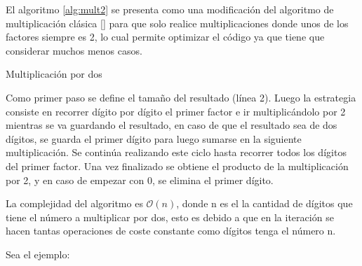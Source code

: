 \documentclass[10pt,journal,compsoc]{IEEEtran}
\begin{document}
El algoritmo \ref{alg:mult2} se presenta como una modificación del algoritmo de multiplicación clásica [\cite{DK14}] para que solo realice multiplicaciones donde unos de los factores siempre es 2, lo cual permite optimizar el código ya que tiene que considerar muchos menos casos.

\begin{algorithm}
\DontPrintSemicolon
{}

\caption{ Multiplicación por dos}
\label{alg:mult2}
\end{algorithm}


Como primer paso se define el tamaño del resultado (línea 2).
Luego la estrategia consiste en recorrer dígito por dígito el primer factor e ir multiplicándolo por 2 mientras se va guardando el resultado, en caso de que el resultado sea de dos dígitos, se guarda el primer dígito para luego sumarse en la siguiente multiplicación. Se continúa realizando este ciclo hasta recorrer todos los dígitos del primer factor.
Una vez finalizado se obtiene el producto de la multiplicación por 2, y en caso de empezar con 0, se elimina el primer dígito.

La complejidad del algoritmo es $\mathcal{O}(n)$, donde n es el la cantidad de dígitos que tiene el número a multiplicar por dos, esto es debido a que en la iteración se hacen tantas operaciones de coste constante como dígitos tenga el número n.

Sea el ejemplo:
\end{document}
